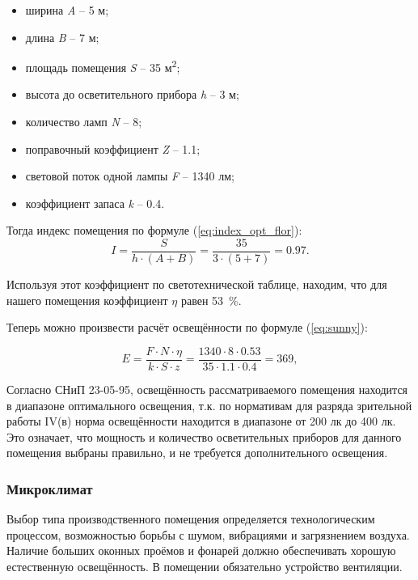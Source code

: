 \begin{itemize}
\item ширина \foreignlanguage{english}{\textit{A}} – \foreignlanguage{english}{5} м;
\item длина \foreignlanguage{english}{\textit{B}}\foreignlanguage{english}{ }– 7 м;
\item площадь помещения \foreignlanguage{english}{\textit{S}}\foreignlanguage{english}{ }– 35 м\textsuperscript{2};
\item высота до осветительного прибора \foreignlanguage{english}{\textit{h}} – 3 м;
\item количество ламп \foreignlanguage{english}{\textit{N}} – 8;
\item поправочный коэффициент \foreignlanguage{english}{\textit{Z}} – 1.1;
\item световой поток одной лампы \foreignlanguage{english}{\textit{F}} – 1340 лм;
\item коэффициент запаса \foreignlanguage{english}{\textit{k}} – 0.4.
\end{itemize}
Тогда индекс помещения по формуле (\ref{eq:index_opt_flor}):
$$I = \dfrac{S}{h{\cdot}(A+B)} = \dfrac{35}{3{\cdot}(5+7)} = 0.97.$$

Используя этот коэффициент по светотехнической таблице, находим, что для нашего помещения коэффициент $\eta$ равен 53~\%.

Теперь можно произвести расчёт освещённости по формуле (\ref{eq:sunny}):

$$
E=\dfrac{F\cdot N \cdot \eta}{k \cdot S \cdot z} = \dfrac{1340{\cdot}8{\cdot}0.53}{35{\cdot}1.1{\cdot}0.4}=369,
$$

Согласно СНиП 23-05-95, освещённость рассматриваемого помещения находится в диапазоне оптимального освещения, т.к. по нормативам для разряда зрительной работы IV(в) норма освещённости находится в диапазоне от 200 лк до 400 лк. Это означает, что мощность и количество осветительных приборов для данного помещения выбраны правильно, и не требуется дополнительного освещения.
\subsubsection{Микроклимат}

Выбор типа производственного помещения определяется технологическим процессом, возможностью борьбы с шумом, вибрациями и загрязнением воздуха. Наличие больших оконных проёмов и фонарей должно обеспечивать хорошую естественную освещённость. В помещении обязательно устройство вентиляции.

